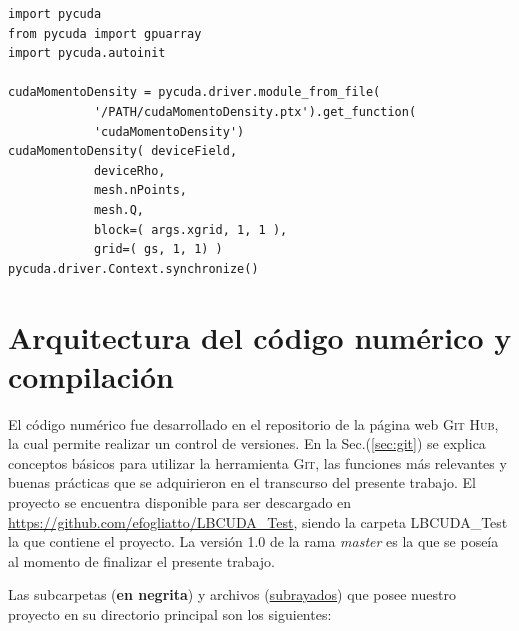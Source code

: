 {\footnotesize
	\begin{frame}{}
		\begin{lstlisting}[frame=single]
import pycuda
from pycuda import gpuarray
import pycuda.autoinit
		
cudaMomentoDensity = pycuda.driver.module_from_file(
			'/PATH/cudaMomentoDensity.ptx').get_function(
			'cudaMomentoDensity')					
cudaMomentoDensity(	deviceField,
			deviceRho,
			mesh.nPoints,
			mesh.Q,
			block=( args.xgrid, 1, 1 ),
			grid=( gs, 1, 1) )     			    
pycuda.driver.Context.synchronize()
		\end{lstlisting}
		
	\end{frame}
}




	   

\section{Arquitectura del código numérico y compilación}

El código numérico fue desarrollado en el repositorio de la página web \textsc{Git Hub}, la cual permite realizar un control de versiones. En la Sec.(\ref{sec:git}) se explica conceptos básicos para utilizar la herramienta \textsc{Git}, las funciones más relevantes y buenas prácticas que se adquirieron en el transcurso del presente trabajo. El proyecto se encuentra disponible para ser descargado en \url{https://github.com/efogliatto/LBCUDA_Test}, siendo la carpeta LBCUDA\_Test la que contiene el proyecto. La versión 1.0 de la rama \textit{master} es la que se poseía al momento de finalizar el presente trabajo.

Las subcarpetas (\textbf{en negrita}) y archivos (\underline{subrayados}) que posee nuestro proyecto en su directorio principal son los siguientes:

